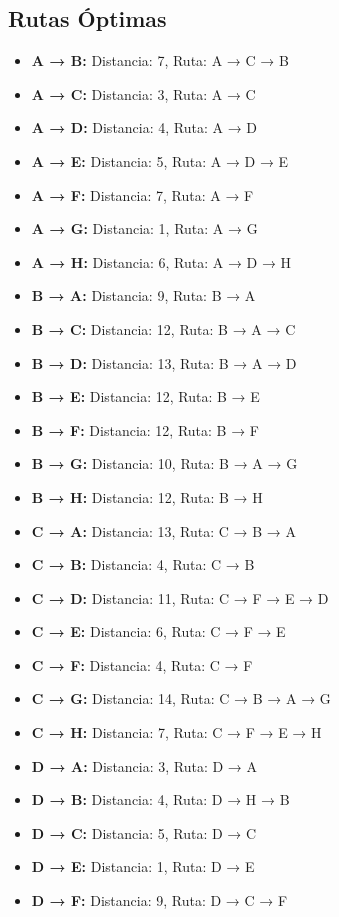 \documentclass[12pt]{article}
\begin{document}
\clearpage
\subsection{Rutas Óptimas}
\begin{itemize}
\item \textbf{A → B:} Distancia: 7, Ruta: A → C → B
\item \textbf{A → C:} Distancia: 3, Ruta: A → C
\item \textbf{A → D:} Distancia: 4, Ruta: A → D
\item \textbf{A → E:} Distancia: 5, Ruta: A → D → E
\item \textbf{A → F:} Distancia: 7, Ruta: A → F
\item \textbf{A → G:} Distancia: 1, Ruta: A → G
\item \textbf{A → H:} Distancia: 6, Ruta: A → D → H
\item \textbf{B → A:} Distancia: 9, Ruta: B → A
\item \textbf{B → C:} Distancia: 12, Ruta: B → A → C
\item \textbf{B → D:} Distancia: 13, Ruta: B → A → D
\item \textbf{B → E:} Distancia: 12, Ruta: B → E
\item \textbf{B → F:} Distancia: 12, Ruta: B → F
\item \textbf{B → G:} Distancia: 10, Ruta: B → A → G
\item \textbf{B → H:} Distancia: 12, Ruta: B → H
\item \textbf{C → A:} Distancia: 13, Ruta: C → B → A
\item \textbf{C → B:} Distancia: 4, Ruta: C → B
\item \textbf{C → D:} Distancia: 11, Ruta: C → F → E → D
\item \textbf{C → E:} Distancia: 6, Ruta: C → F → E
\item \textbf{C → F:} Distancia: 4, Ruta: C → F
\item \textbf{C → G:} Distancia: 14, Ruta: C → B → A → G
\item \textbf{C → H:} Distancia: 7, Ruta: C → F → E → H
\item \textbf{D → A:} Distancia: 3, Ruta: D → A
\item \textbf{D → B:} Distancia: 4, Ruta: D → H → B
\item \textbf{D → C:} Distancia: 5, Ruta: D → C
\item \textbf{D → E:} Distancia: 1, Ruta: D → E
\item \textbf{D → F:} Distancia: 9, Ruta: D → C → F

\end{itemize}
\end{document}
